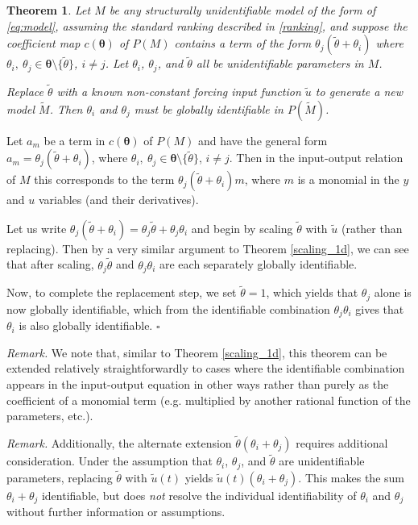 \documentclass[a4paper,fleqn]{cas-dc}
\newtheorem{theorem}{Theorem}
\theoremstyle{definition}
\begin{document}
\begin{theorem}\label{replace_2d}
    Let $M$ be any structurally unidentifiable model of the form of \cref{eq:model}, assuming the standard ranking described in \cref{ranking}, and suppose the coefficient map $c(\pmb{\theta})$ of $P(M)$ contains a term of the form $\theta_j (\tilde{\theta} + \theta_i)$ where $\theta_i, ~\theta_j \in  \pmb{\theta} \setminus \{\tilde{\theta}\}$, $i \neq j$. Let $\theta_i$, $\theta_j$, and $\tilde{\theta}$ all be unidentifiable parameters in $M$.
 
    Replace $\tilde{\theta}$ with a known non-constant forcing input function $\tilde{u}$ to generate a new model $\tilde{M}$. 
    Then $\theta_i$ and $\theta_j$ must be globally identifiable in $P(\tilde{M})$.
\end{theorem}
\begin{pf}
    Let $a_m$ be a term in $c(\pmb{\theta})$ of $P(M)$ and have the general form $a_m = \theta_j (\tilde{\theta} + \theta_i)$, where $\theta_i, ~\theta_j \in  \pmb{\theta} \setminus \{\tilde{\theta}\}$, $i \neq j$. 
    Then in the input-output relation of $M$ this corresponds to the term $\theta_j (\tilde{\theta} + \theta_i)m$, where $m$ is a monomial in the $y$ and $u$ variables (and their derivatives).

    Let us write $\theta_j (\tilde{\theta} + \theta_i) = \theta_j \tilde{\theta} + \theta_j \theta_i$ and begin by scaling $\tilde{\theta}$ with $\tilde{u}$ (rather than replacing). Then by a very similar argument to Theorem  \ref{scaling_1d}, we can see that after scaling, $\theta_j \tilde{\theta}$ and $\theta_j \theta_i$ are each separately globally identifiable.

    Now, to complete the replacement step, we set $\tilde{\theta} = 1$, which yields that $\theta_j$ alone is now globally identifiable, which from the identifiable combination $\theta_j \theta_i$ gives that $\theta_i$ is also globally identifiable. $\square$
\end{pf}


\noindent
\textit{Remark.} We note that, similar to Theorem \ref{scaling_1d}, this theorem can be extended relatively straightforwardly to cases where the identifiable combination appears in the input-output equation in other ways rather than purely as the coefficient of a monomial term (e.g. multiplied by another rational function of the parameters, etc.). \medskip

\noindent
\textit{Remark.} Additionally, the alternate extension $\tilde{\theta}(\theta_i + \theta_j)$ requires additional consideration. Under the assumption that $\theta_i$, $\theta_j$, and $\tilde{\theta}$ are unidentifiable parameters, replacing $\tilde{\theta}$ with $\tilde{u}(t)$ yields $\tilde{u}(t)(\theta_i + \theta_j)$. This makes the sum $\theta_i + \theta_j$ identifiable, but does \textit{not} resolve the individual identifiability of $\theta_i$ and $\theta_j$ without further information or assumptions.
\end{document}
